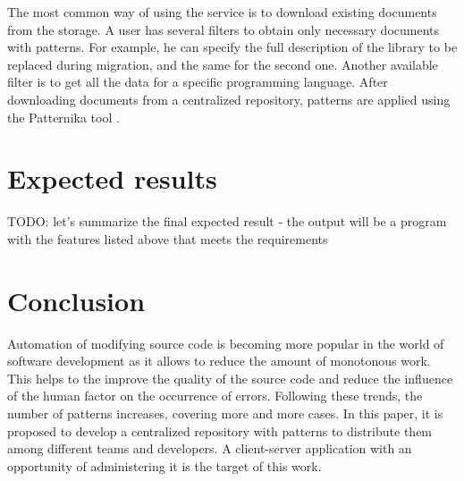\documentclass[letterpaper, 10 pt, conference]{ieeeconf}  %
\begin{document}
The most common way of using the service is to download existing
documents from the storage. A user has several filters to obtain only
necessary documents with patterns. For example, he can specify the
full description of the library to be replaced during migration, and
the same for the second one. Another available filter is to get all
the data for a specific programming language. After downloading
documents from a centralized repository, patterns are applied using
the Patternika tool \cite{c1}. 

\section{Expected results}

TODO: let's summarize the final expected result - the output will be a
program with the features listed above that meets the requirements

\section{Conclusion}

Automation of modifying source code is becoming more popular
in the world of software development as it allows to reduce the amount
of monotonous work. This helps to the improve the quality of the source
code and reduce the influence of the human factor on the occurrence of
errors. Following these trends, the number of patterns increases, covering
more and more cases. In this paper, it is proposed to develop a
centralized repository with patterns to distribute them among different
teams and developers. A client-server application with an opportunity of administering it is the target of this work.

\addtolength{\textheight}{-12cm}   %




\end{document}
